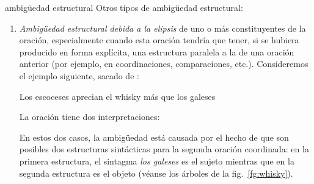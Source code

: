 \begin{persabermes}{ambigüedad estructural} Otros tipos de ambigüedad estructural: \begin{enumerate} \item \emph{Ambigüedad estructural debida a la elipsis} de uno o más constituyentes de la oración, especialmente cuando esta oración tendría que tener, si se hubiera producido en forma explícita, una estructura paralela a la de una oración anterior (por ejemplo, en coordinaciones, comparaciones, etc.).  Consideremos el ejemplo siguiente, sacado de \citet[p.399]{radford09b}: \begin{exemple} \label{eq:escocesos} Los escoceses aprecian el whisky más que los galeses \end{exemple} La oración tiene dos interpretaciones:  En estos dos casos, la ambigüedad está causada por el hecho de que son posibles dos estructuras sintácticas para la segunda oración coordinada: en la primera estructura, el sintagma \emph{los galeses} es el sujeto mientras que en la segunda estructura es el objeto (véanse los árboles de la fig.~\ref{fg:whisky}). 


\end{enumerate}
\end{persabermes}

